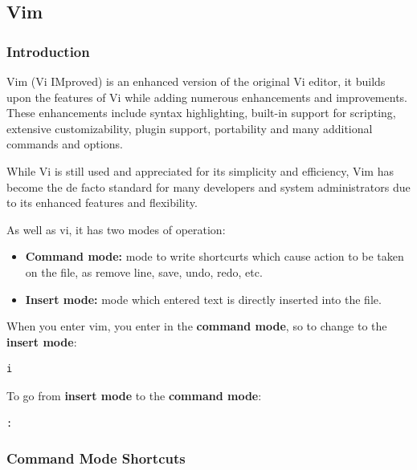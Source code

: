 \documentclass{article}
\newenvironment{codetemplate}[1][]{%
  \mybasecolorbox[#1]
  \itshape
}{%
  \endmybasecolorbox
}
\begin{document}
\subsection{Vim}

\subsubsection{Introduction}

Vim (Vi IMproved) is an enhanced version of the original Vi editor, it builds upon the features of Vi while adding numerous enhancements and improvements. These enhancements include syntax highlighting, built-in support for scripting, extensive customizability, plugin support, portability and many additional commands and options.

While Vi is still used and appreciated for its simplicity and efficiency, Vim has become the de facto standard for many developers and system administrators due to its enhanced features and flexibility.

As well as vi, it has two modes of operation:

\begin{itemize}
    \item \textbf{Command mode:} mode to write shortcurts which cause action to be taken on the file, as remove line, save, undo, redo, etc.
    \item \textbf{Insert mode:} mode which entered text is directly inserted into the file.
\end{itemize}

When you enter vim, you enter in the \textbf{command mode}, so to change to the \textbf{insert mode}:

\begin{codetemplate}{}
\begin{verbatim}
i
\end{verbatim}
\end{codetemplate}

To go from \textbf{insert mode} to the \textbf{command mode}:
\begin{codetemplate}{}
\begin{verbatim}
:
\end{verbatim}
\end{codetemplate}

\subsubsection{Command Mode Shortcuts}
\end{document}
